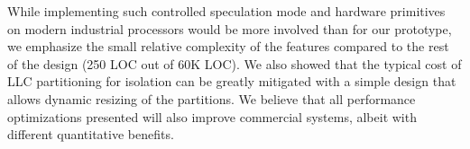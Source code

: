 While implementing such controlled speculation mode and hardware primitives on modern industrial processors would be more involved than for our prototype, we emphasize the small relative complexity of the features compared to the rest of the design (250 LOC out of 60K LOC).
We also showed that the typical cost of LLC partitioning for isolation can be greatly mitigated with a simple design that allows dynamic resizing of the partitions.
We believe that all performance optimizations presented will also improve commercial systems, albeit with different quantitative benefits.
